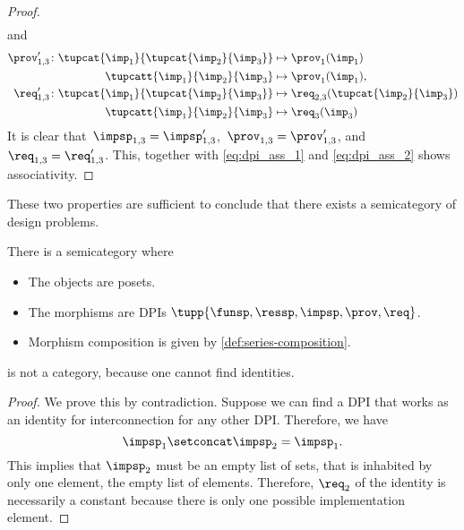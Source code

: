\begin{proof}
\begin{equation}
\begin{aligned}
        \end{aligned}
    \end{equation}
    and
    \begin{equation}
        \begin{aligned}
            \prov'_{1,3} \colon  \tupcat {\imp_{1}}{\tupcat {\imp_{2}} {\imp_{3}}} & \mapsto\prov_{1}(\imp_{1}) \\
            \tupcatt{\imp_{1}}{\imp_{2}}{\imp_{3}}                                 & \mapsto\prov_{1}(\imp_{1}), \\
            \req'_{1,3} \colon  \tupcat {\imp_{1}}{\tupcat {\imp_{2}} {\imp_{3}}}  & \mapsto\req_{2,3}(\tupcat {\imp_{2}} {\imp_{3}}) \\
            \tupcatt{\imp_{1}}{\imp_{2}}{\imp_{3}}                                 & \mapsto \req_{3}(\imp_{3})
        \end{aligned}
    \end{equation}
    It is clear that~$\impsp_{1,3}=\impsp'_{1,3}$,~$\prov_{1,3}=\prov'_{1,3}$, and~$\req_{1,3}=\req'_{1,3}$.
    This, together with \cref{eq:dpi_ass_1} and \cref{eq:dpi_ass_2} shows associativity.
\end{proof}

These two properties are sufficient to conclude that there exists a semicategory of design problems.

\begin{definition}
    \label{def:DPIcat}
    There is a semicategory \DPI where
    \begin{itemize}
        \item The objects are posets.
        \item The morphisms are DPIs $\tupp{\funsp,\ressp,\impsp,\prov,\req}$.
        \item Morphism composition is given by \cref{def:series-composition}.
    \end{itemize}
\end{definition}

\begin{lemma}
    \DPI is not a category, because one cannot find identities.
\end{lemma}
\begin{proof}
    We prove this by contradiction.
    Suppose we can find a DPI that works as an identity for interconnection for any other DPI.
    Therefore, we have
    \begin{equation}
        \impsp_{1} \setconcat \impsp_{2} = \impsp_{1}.
    \end{equation}
    This implies that $\impsp_{2}$ must be an empty list of sets, that is inhabited by only one element, the empty list of elements.
    Therefore, $\req_2$ of the identity is necessarily a constant because there is only one possible implementation element.
\end{proof}

